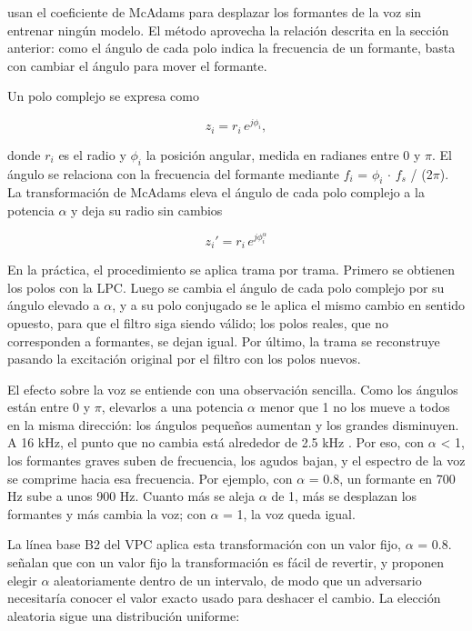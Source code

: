 \documentclass[10pt,twocolumn]{article}
\newcommand{\textcite}[1]{\citet{#1}}
\newcommand{\parencite}[1]{\citep{#1}}
\begin{document}
\textcite{patino2021} usan el coeficiente de McAdams para desplazar los formantes de la voz sin entrenar ningún modelo. El método aprovecha la relación descrita en la sección anterior: como el ángulo de cada polo indica la frecuencia de un formante, basta con cambiar el ángulo para mover el formante.

Un polo complejo se expresa como

\begin{equation}\label{eq:pole}
z_i = r_i \, e^{j\phi_i},
\end{equation}

\noindent donde $r_i$ es el radio y $\phi_i$ la posición angular, medida en radianes entre 0 y $\pi$. El ángulo se relaciona con la frecuencia del formante mediante $f_i$ = $\phi_i$ $\cdot$ $f_s$ / (2$\pi$). La transformación de McAdams eleva el ángulo de cada polo complejo a la potencia $\alpha$ y deja su radio sin cambios

\begin{equation}\label{eq:mcadams}
z_i' = r_i \, e^{j\phi_i^{\alpha}}
\end{equation}

\noindent En la práctica, el procedimiento se aplica trama por trama. Primero se obtienen los polos con la LPC. Luego se cambia el ángulo de cada polo complejo por su ángulo elevado a $\alpha$, y a su polo conjugado se le aplica el mismo cambio en sentido opuesto, para que el filtro siga siendo válido; los polos reales, que no corresponden a formantes, se dejan igual. Por último, la trama se reconstruye pasando la excitación original por el filtro con los polos nuevos.

El efecto sobre la voz se entiende con una observación sencilla. Como los ángulos están entre 0 y $\pi$, elevarlos a una potencia $\alpha$ menor que 1 no los mueve a todos en la misma dirección: los ángulos pequeños aumentan y los grandes disminuyen. A 16 kHz, el punto que no cambia está alrededor de 2.5 kHz \parencite{patino2021}. Por eso, con $\alpha$ < 1, los formantes graves suben de frecuencia, los agudos bajan, y el espectro de la voz se comprime hacia esa frecuencia. Por ejemplo, con $\alpha$ = 0.8, un formante en 700 Hz sube a unos 900 Hz. Cuanto más se aleja $\alpha$ de 1, más se desplazan los formantes y más cambia la voz; con $\alpha$ = 1, la voz queda igual.

La línea base B2 del VPC aplica esta transformación con un valor fijo, $\alpha$ = 0.8. \textcite{patino2021} señalan que con un valor fijo la transformación es fácil de revertir, y proponen elegir $\alpha$ aleatoriamente dentro de un intervalo, de modo que un adversario necesitaría conocer el valor exacto usado para deshacer el cambio. La elección aleatoria sigue una distribución uniforme:
\end{document}

